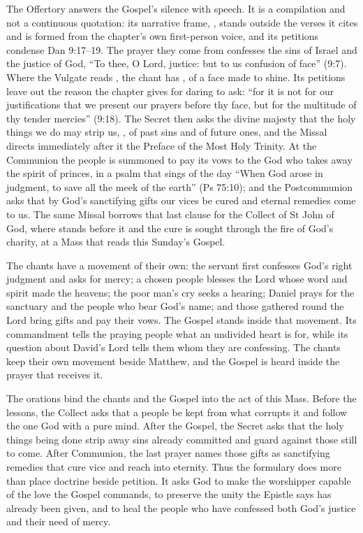 The Offertory answers the Gospel's silence with speech. It is a compilation and
not a continuous quotation: its narrative frame, , stands outside the verses it cites and is formed from the
chapter's own first-person voice, and its petitions condense Dan 9:17--19.
The prayer they come from confesses the sins of Israel and the justice of God,
``To thee, O Lord, justice: but to us confusion of face'' (9:7).
Where the Vulgate reads , the chant has
, of a face made to shine. Its petitions leave out
the reason the chapter gives for daring to ask: ``for it is not for our
justifications that we present our prayers before thy face, but for the
multitude of thy tender mercies'' (9:18). The Secret then asks the
divine majesty that the holy things we do may strip us, , of past
sins and of future ones, and the Missal directs immediately after it the
Preface of the Most Holy Trinity. At the Communion the people is summoned to
pay its vows to the God who takes away the spirit of princes, in a psalm that
sings of the day ``When God arose in judgment, to save all the meek of the
earth'' (Ps 75:10); and the
Postcommunion asks that by God's sanctifying gifts our vices be cured and
eternal remedies come to us. The same Missal borrows that last clause for the
Collect of St John of God, where  stands before it
and the cure is sought through the fire of God's charity, at a Mass that reads
this Sunday's Gospel.

The chants have a movement of their own: the servant first
confesses God's right judgment and asks for mercy; a chosen people blesses the
Lord whose word and spirit made the heavens; the poor man's cry seeks a
hearing; Daniel prays for the sanctuary and the people who bear God's name;
and those gathered round the Lord bring gifts and pay their vows. The Gospel
stands inside that movement. Its commandment tells the praying people what
an undivided heart is for, while its question about David's Lord tells them
whom they are confessing. The chants keep their own movement beside Matthew,
and the Gospel is heard inside the prayer that receives it.

The orations bind the chants and the Gospel into the act of this Mass. Before the
lessons, the Collect asks that a people be kept from what corrupts it and
follow the one God with a pure mind. After the Gospel, the Secret asks that the
holy things being done strip away sins already committed and guard against
those still to come. After Communion, the last prayer names those gifts as
sanctifying remedies that cure vice and reach into eternity. Thus the
formulary does more than place doctrine beside petition. It asks God to make
the worshipper capable of the love the Gospel commands, to preserve the unity
the Epistle says has already been given, and to heal the people who have
confessed both God's justice and their need of mercy.

